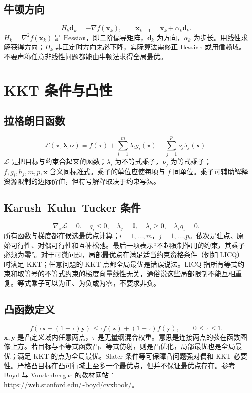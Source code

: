 \subsection{牛顿方向}
\begin{equation}H_k\boldsymbol d_k=-\nabla f(\boldsymbol x_k),\qquad \boldsymbol x_{k+1}=\boldsymbol x_k+\alpha_k\boldsymbol d_k.\end{equation}
$H_k=\nabla^2 f(\boldsymbol x_k)$ 是 Hessian，即二阶偏导矩阵，$\boldsymbol d_k$ 为方向，$\alpha_k$ 为步长。用线性求解获得方向；$H_k$ 非正定时方向未必下降，实际算法需修正 Hessian 或用信赖域。不要声称任意非线性问题都能由牛顿法求得全局最优。

\section{KKT 条件与凸性}
\subsection{拉格朗日函数}
\begin{equation}\mathcal L(\boldsymbol x,\boldsymbol\lambda,\boldsymbol\nu)=f(\boldsymbol x)+\sum_{i=1}^m\lambda_i g_i(\boldsymbol x)+\sum_{j=1}^p\nu_j h_j(\boldsymbol x).\end{equation}
$\mathcal L$ 是把目标与约束合起来的函数；$\lambda_i$ 为不等式乘子，$\nu_j$ 为等式乘子；$f,g_i,h_j,m,p,\boldsymbol x$ 含义同标准式。乘子的单位应使每项与 $f$ 同单位。乘子可辅助解释资源限制的边际价值，但符号解释取决于约束写法。
\subsection{Karush--Kuhn--Tucker 条件}
\begin{equation}\nabla_x\mathcal L=0,\quad g_i\le0,\quad h_j=0,\quad\lambda_i\ge0,\quad\lambda_i g_i=0.\end{equation}
所有函数与梯度都在候选最优点计算；$i=1,\ldots,m$，$j=1,\ldots,p$。依次是驻点、原始可行性、对偶可行性和互补松弛。最后一项表示“不起限制作用的约束，其乘子必须为零”。对于可微问题，局部最优点在满足适当约束资格条件（例如 LICQ）时满足 KKT；任意问题的 KKT 点都全局最优是错误说法。LICQ 指所有等式约束和取等号的不等式约束的梯度向量线性无关，通俗说这些局部限制不能互相重复。等式乘子可以为正、为负或为零，不要求非负。
\subsection{凸函数定义}
\begin{equation}f(\tau\boldsymbol x+(1-\tau)\boldsymbol y)\le\tau f(\boldsymbol x)+(1-\tau)f(\boldsymbol y),\qquad 0\le\tau\le1.\end{equation}
$\boldsymbol x,\boldsymbol y$ 是凸定义域内任意两点，$\tau$ 是无量纲混合权重。意思是连接两点的弦在函数图像上方。若目标与不等式函数凸、等式仿射，则是凸优化，局部最优也是全局最优；满足 KKT 的点为全局最优。Slater 条件等可保障凸问题强对偶和 KKT 必要性。严格凸目标在凸可行域上至多一个最优点，但并不保证最优点存在。参考 Boyd 与 Vandenberghe 的教材网站：\url{https://web.stanford.edu/~boyd/cvxbook/}。


